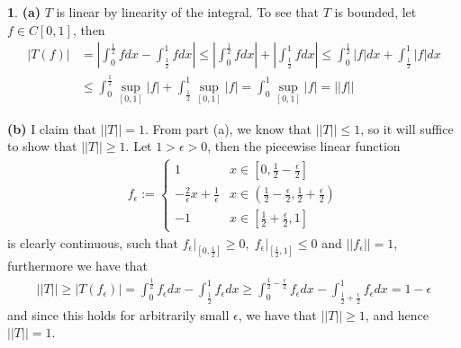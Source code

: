 \documentclass[10.5pt]{article}
\theoremstyle{definition}
\newtheorem{pb}{}
\newcommand{\abs}[1]{\left\vert#1\right\vert}
\newcommand{\norm}[1]{\lvert\lvert#1\rvert\rvert}
\begin{document}
        \begin{pb}
            \textbf{(a)} \(T\) is linear by linearity of the integral. To see that \(T\) is bounded, let \(f \in C[0,1]\), then
            \begin{align*}
                \abs{T(f)} &= \abs{\int_0^{\frac12} fdx - \int_{\frac12}^1 fdx} \leq\abs{\int_0^{\frac12}fdx} + \abs{\int_{\frac12}^1fdx} \leq \int_0^{\frac12}\abs{f}dx + \int_{\frac12}^1\abs{f}dx \\
                &\leq \int_0^{\frac12}\sup_{[0,1]}\abs{f} + \int_{\frac12}^1\sup_{[0,1]}\abs{f} = \int_0^1 \sup_{[0,1]}\abs{f} = \norm{f}
            \end{align*}

            \textbf{(b)} I claim that \(\norm{T} = 1\). From part (a), we know that \(\norm{T} \leq 1\), so it will suffice to show that \(\norm{T} \geq 1\). Let \(1 > \epsilon > 0\), then the piecewise linear function
            \begin{align*}
                f_\epsilon := \begin{cases}
                    1 & x \in [0, \frac12 - \frac{\epsilon}{2}] \\
                    -\frac{2}{\epsilon}x + \frac{1}{\epsilon} & x \in (\frac12 - \frac{\epsilon}{2}, \frac12 + \frac{\epsilon}{2}) \\
                    -1 & x \in [\frac12 + \frac{\epsilon}{2}, 1]
                \end{cases}
            \end{align*}
            is clearly continuous, such that \(f_\epsilon\vert_{[0,\frac12]} \geq 0, \; f_\epsilon\vert_{[\frac12,1]} \leq 0\) and \(\norm{f_\epsilon} = 1\), furthermore we have that
            \begin{align*}
                \norm{T} \geq \abs{T(f_\epsilon)} = \int_0^{\frac12}f_\epsilon dx - \int_{\frac12}^1f_\epsilon dx \geq \int_0^{\frac12 - \frac{\epsilon}{2}}f_\epsilon dx - \int_{\frac12 + \frac{\epsilon}{2}}^1f_\epsilon dx = 1 - \epsilon
            \end{align*}
            and since this holds for arbitrarily small \(\epsilon\), we have that \(\norm{T} \geq 1\), and hence \(\norm{T} = 1\).


\end{pb}
\end{document}
